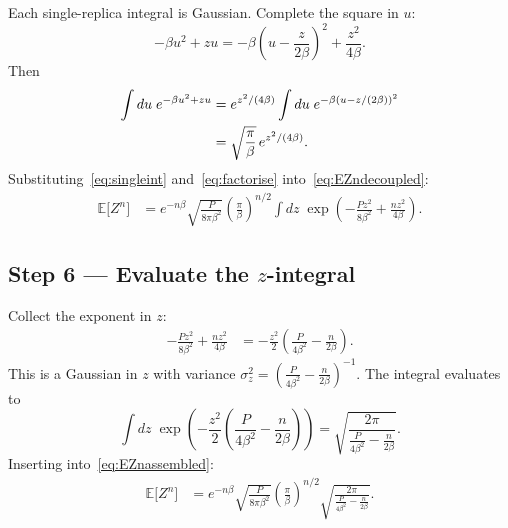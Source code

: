 \documentclass[nobib,justified]{tufte-handout}
\newcommand{\EE}{\mathbb{E}}
\begin{document}
Each single-replica integral is Gaussian.  Complete the square in $u$:
\begin{equation}
  -\beta u^2 + zu
  = -\beta\!\left(u - \frac{z}{2\beta}\right)^2 + \frac{z^2}{4\beta}.
  \label{eq:cs2}
\end{equation}
Then
\begin{align}
  \int du\;e^{-\beta u^2 + zu}
  &= e^{z^2/(4\beta)}
    \int du\;e^{-\beta(u-z/(2\beta))^2} \notag\\
  &= \sqrt{\frac{\pi}{\beta}}\,e^{z^2/(4\beta)}.
  \label{eq:singleint}
\end{align}
Substituting~\eqref{eq:singleint} and~\eqref{eq:factorise}
into~\eqref{eq:EZndecoupled}:
\begin{align}
  \EE\bigl[Z^n\bigr]
  &= e^{-n\beta}\sqrt{\frac{P}{8\pi\beta^2}}
    \left(\frac{\pi}{\beta}\right)^{n/2}
    \int dz\;
    \exp\!\left(-\frac{Pz^2}{8\beta^2} + \frac{nz^2}{4\beta}\right).
  \label{eq:EZnassembled}
\end{align}

\subsection*{Step 6 --- Evaluate the $z$-integral}

Collect the exponent in $z$:
\begin{align}
  -\frac{Pz^2}{8\beta^2} + \frac{nz^2}{4\beta}
  &= -\frac{z^2}{2}\left(\frac{P}{4\beta^2} - \frac{n}{2\beta}\right).
  \label{eq:zexp}
\end{align}
This is a Gaussian in $z$ with variance
$\sigma_z^2 = \left(\frac{P}{4\beta^2}-\frac{n}{2\beta}\right)^{-1}$.
The integral evaluates to
\begin{equation}
  \int dz\;
  \exp\!\left(-\frac{z^2}{2}\!\left(\frac{P}{4\beta^2}-\frac{n}{2\beta}\right)\right)
  = \sqrt{\frac{2\pi}{\frac{P}{4\beta^2}-\frac{n}{2\beta}}}.
  \label{eq:zint}
\end{equation}
Inserting into~\eqref{eq:EZnassembled}:
\begin{align}
  \EE\bigl[Z^n\bigr]
  &= e^{-n\beta}\sqrt{\frac{P}{8\pi\beta^2}}
    \left(\frac{\pi}{\beta}\right)^{n/2}
    \sqrt{\frac{2\pi}{\frac{P}{4\beta^2}-\frac{n}{2\beta}}}.
  \label{eq:EZnfull}
\end{align}

\end{document}
